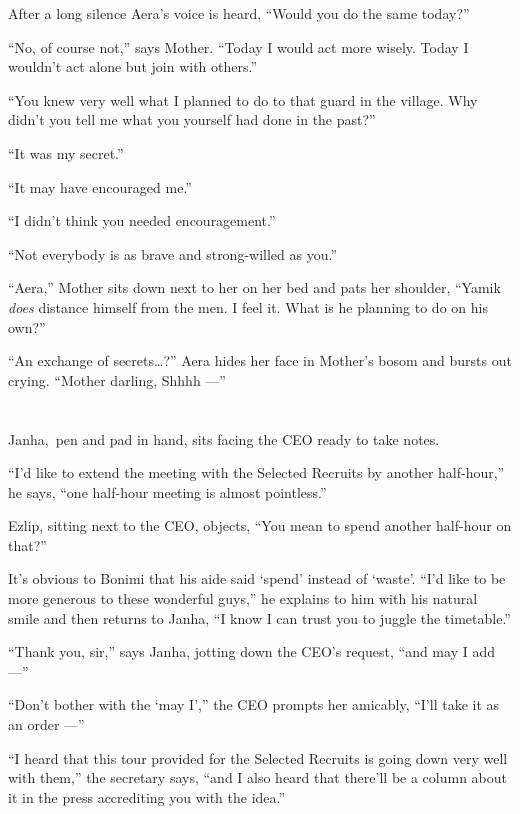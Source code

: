 \documentclass[twoside,11pt]{book}
\begin{document}
After a long silence Aera's voice is heard, ``Would you do the same today?''

``No, of course not,'' says Mother. ``Today I would act more wisely. Today I
wouldn't act alone but join with others.''

``You knew very well what I planned to do to that guard in the village. Why didn't you tell me what you
yourself had done in the past?''

``It was my secret.''

``It may have encouraged me.''

``I didn't think you needed encouragement.''

``Not everybody is as brave and strong-willed as you.''

``Aera,'' Mother sits down next to her on her bed and pats her shoulder, ``Yamik
\textit{does} distance himself from the men. I feel it. What is he planning to do on his own?''

``An exchange of secrets{\ldots}?'' Aera hides her face in Mother's bosom and bursts out
crying. ``Mother darling, Shhhh ---''


\chapter{}

Janha,~pen and pad in hand, sits facing the CEO ready to take notes.

``I'd like to extend the meeting with the Selected Recruits by another half-hour,'' he says,
``one half-hour meeting is almost pointless.''

Ezlip, sitting next to the CEO, objects, ``You mean to spend another half-hour on that?''

It's obvious to Bonimi that his aide said `spend' instead of `waste'. ``I'd like to be more generous to
these wonderful guys,'' he explains to him with his natural smile and then returns to Janha,
``I know I can trust you to juggle the timetable.''

``Thank you, sir,'' says Janha, jotting down the CEO's request, ``and may I add ---''

``Don't bother with the `may I','' the CEO prompts her amicably, ``I'll take
it as an order ---''

``I heard that this tour provided for the Selected Recruits is going down very well with
them,'' the secretary says, ``and I also heard that there'll be a column about it in the
press accrediting you with the idea.''
\end{document}
